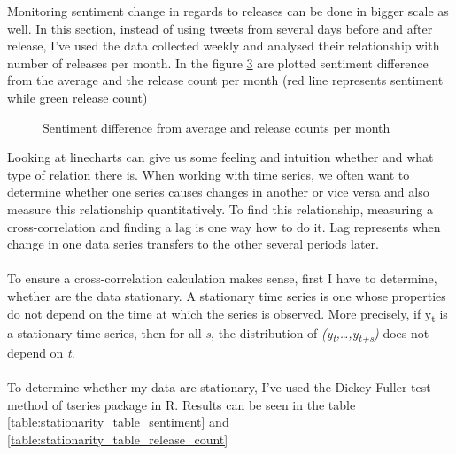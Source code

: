 Monitoring sentiment change in regards to releases can be done in bigger scale as well. In this section, instead of using tweets from several days before and after release, I've used the data collected weekly and analysed their relationship with number of releases per month. In the figure \ref{fig:ReleasesSentiment3} are plotted sentiment difference from the average and the release count per month (red line represents sentiment while green release count)

\begin{figure}[H]%
    \centering
    \qquad
    \label{fig:ReleasesSentiment1}%
\end{figure}


\begin{figure}[H]%
    \centering
    \qquad
    \label{fig:ReleasesSentiment2}%
\end{figure}


\begin{figure}[H]%
    \centering
    \qquad
        \caption{Sentiment difference from average and release counts per month}
    \label{fig:ReleasesSentiment3}%
\end{figure}

Looking at linecharts can give us some feeling and intuition whether and what type of relation there is. When working with time series, we often want to determine whether one series causes changes in another or vice versa and also measure this relationship quantitatively. To find this relationship, measuring a cross-correlation and finding a lag is one way how to do it. Lag represents when change in one data series transfers to the other several periods later. \\
\\
To ensure a cross-correlation calculation makes sense, first I have to determine, whether are the data stationary. A stationary time series is one whose properties do not depend on the time at which the series is observed\cite{hyndman5forecast}. More precisely, if y\textsubscript{t} is a stationary time series, then for all \textit{s}, the distribution of \textit{(y\textsubscript{t},…,y\textsubscript{t+s})} does not depend on \textit{t}.\\
\\
To determine whether my data are stationary, I've used the Dickey-Fuller test method of tseries package in R. Results can be seen in the table \ref{table:stationarity_table_sentiment} and \ref{table:stationarity_table_release_count} 

